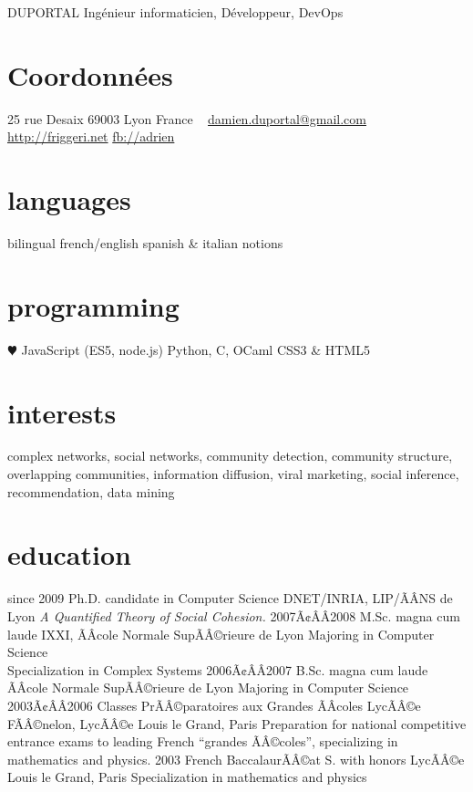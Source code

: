 \documentclass[]{friggeri-cv}
\begin{document}
 {DUPORTAL}
       {Ingénieur informaticien, Développeur, DevOps}


\begin{aside}
  \section{Coordonnées}
    25 rue Desaix
    69003 Lyon
    France
    ~
    \href{mailto:damien.duportal@gmail.com}{damien.duportal@gmail.com}
    \href{http://friggeri.net}{http://friggeri.net}
    \href{http://facebook.com/adrien}{fb://adrien}
  \section{languages}
    bilingual french/english
    spanish \& italian notions
  \section{programming}
    {\color{red} $\varheartsuit$} JavaScript
    (ES5, node.js)
    Python, C, OCaml
    CSS3 \& HTML5
\end{aside}

\section{interests}

complex networks, social networks, community detection, community structure,
overlapping communities, information diffusion, viral marketing, social
inference, recommendation, data mining

\section{education}

\begin{entrylist}
  \entry
    {since 2009}
    {Ph.D. {\normalfont candidate in Computer Science}}
    {DNET/INRIA, LIP/ÃÂNS de Lyon}
    {\emph{A Quantified Theory of Social Cohesion.}}
  \entry
    {2007Ã¢ÂÂ2008}
    {M.Sc. magna cum laude}
    {IXXI, ÃÂcole Normale SupÃÂ©rieure de Lyon}
    {Majoring in Computer Science\\
    Specialization in Complex Systems}
  \entry
    {2006Ã¢ÂÂ2007}
    {B.Sc. magna cum laude}
    {ÃÂcole Normale SupÃÂ©rieure de Lyon}
    {Majoring in Computer Science}
  \entry
    {2003Ã¢ÂÂ2006}
    {Classes PrÃÂ©paratoires aux Grandes ÃÂcoles}
    {LycÃÂ©e FÃÂ©nelon, LycÃÂ©e Louis le Grand, Paris}
    {Preparation for national competitive entrance exams to leading French ``grandes ÃÂ©coles'', specializing in mathematics and physics.}
  \entry
    {2003}
    {French BaccalaurÃÂ©at S. with honors}
    {LycÃÂ©e Louis le Grand, Paris}
    {Specialization in mathematics and physics}
\end{entrylist}
\end{document}
